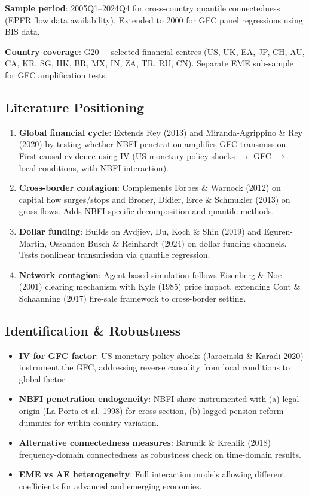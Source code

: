 \documentclass[11pt,a4paper]{article}
\begin{document}
\textbf{Sample period}: 2005Q1--2024Q4 for cross-country quantile connectedness (EPFR flow data availability). Extended to 2000 for GFC panel regressions using BIS data.

\textbf{Country coverage}: G20 + selected financial centres (US, UK, EA, JP, CH, AU, CA, KR, SG, HK, BR, MX, IN, ZA, TR, RU, CN). Separate EME sub-sample for GFC amplification tests.


\subsection{Literature Positioning}

\begin{enumerate}
\item \textbf{Global financial cycle}: Extends Rey (2013) and Miranda-Agrippino \& Rey (2020) by testing whether NBFI penetration amplifies GFC transmission. First causal evidence using IV (US monetary policy shocks $\rightarrow$ GFC $\rightarrow$ local conditions, with NBFI interaction).

\item \textbf{Cross-border contagion}: Complements Forbes \& Warnock (2012) on capital flow surges/stops and Broner, Didier, Erce \& Schmukler (2013) on gross flows. Adds NBFI-specific decomposition and quantile methods.

\item \textbf{Dollar funding}: Builds on Avdjiev, Du, Koch \& Shin (2019) and Eguren-Martin, Ossandon Busch \& Reinhardt (2024) on dollar funding channels. Tests nonlinear transmission via quantile regression.

\item \textbf{Network contagion}: Agent-based simulation follows Eisenberg \& Noe (2001) clearing mechanism with Kyle (1985) price impact, extending Cont \& Schaanning (2017) fire-sale framework to cross-border setting.

\end{enumerate}

\subsection{Identification \& Robustness}

\begin{itemize}
\item \textbf{IV for GFC factor}: US monetary policy shocks (Jarocinski \& Karadi 2020) instrument the GFC, addressing reverse causality from local conditions to global factor.
\item \textbf{NBFI penetration endogeneity}: NBFI share instrumented with (a) legal origin (La Porta et al. 1998) for cross-section, (b) lagged pension reform dummies for within-country variation.
\item \textbf{Alternative connectedness measures}: Barunik \& Krehlik (2018) frequency-domain connectedness as robustness check on time-domain results.
\item \textbf{EME vs AE heterogeneity}: Full interaction models allowing different coefficients for advanced and emerging economies.

\end{itemize}
\end{document}

